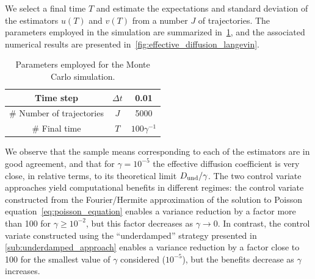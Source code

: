 \documentclass[11pt,a4paper]{article}
\newcommand{\e}{\mathrm{e}}
\newcommand{\expect}[0]{\mathbf{E}}
\renewcommand{\d}{\mathrm d}
\theoremstyle{plain}
\numberwithin{equation}{section}
\renewcommand{\geq}{\geqslant}
\begin{document}

We select a final time $T$ and estimate the expectations and standard deviation of the estimators $u(T)$ and $v(T)$ from a number $J$ of trajectories.
The parameters employed in the simulation are summarized in~\cref{table:parameters_employed_for_mc},
and the associated numerical results are presented in~\cref{fig:effective_diffusion_langevin}.
\begin{table}[ht]
    \centering
    \begin{tabular}{|c|c|c|}
        \hline
        Time step & $\Delta t$ & 0.01 \\
        \hline
        \# Number of trajectories & $J$ & 5000 \\
        \hline
        \# Final time & $T$ & $100 \gamma^{-1}$ \\
        \hline
    \end{tabular}
    \caption{Parameters employed for the Monte Carlo simulation.}
    \label{table:parameters_employed_for_mc}
\end{table}
We observe that the sample means corresponding to each of the estimators are in good agreement,
and that for $\gamma = 10^{-5}$ the effective diffusion coefficient is very close, in relative terms,
to its theoretical limit $D_{\rm und}/\gamma$.
The two control variate approaches yield computational benefits in different regimes:
the control variate constructed from the Fourier/Hermite approximation of the solution to Poisson equation~\eqref{eq:poisson_equation}
enables a variance reduction by a factor more than 100 for $\gamma \geq 10^{-2}$,
but this factor decreases as $\gamma \to 0$.
In contrast, the control variate constructed using the ``underdamped'' strategy presented in \cref{sub:underdamped_approach} enables a variance reduction by a factor close to 100 for the smallest value of $\gamma$ considered ($10^{-5}$),
but the benefits decrease as $\gamma$ increases.
\end{document}
